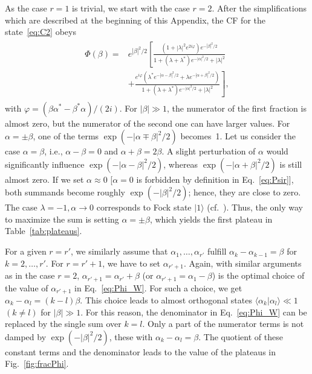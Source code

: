 \documentclass[aps,pra,twocolumn,showpacs,superscriptaddress,10pt]{revtex4-1}
\begin{document}
	As the case $r=1$ is trivial, we start with the case $r=2$.
	After the simplifications which are described at the beginning of this Appendix, the CF for the state~\eqref{eq:C2} obeys
	\begin{align}
	\begin{aligned}
		\Phi(\beta)=&e^{|\beta|^2/2}\left[\frac{(1+|\lambda|^2e^{2i\varphi})e^{-|\beta|^2/2}}{1+(\lambda+\lambda^{\ast})e^{-|\alpha|^{2}/2}+|\lambda|^2} \right.\\
		&+\left.\frac{e^{i\varphi}(\lambda^{\ast} e^{-|\alpha-\beta|^{2}/2}+\lambda e^{-|\alpha+\beta|^{2}/2})}{1+(\lambda+\lambda^{\ast})e^{-|\alpha|^{2}/2}+|\lambda|^2}\right],
	\end{aligned}
	\end{align}
	with $\varphi=(\beta\alpha^{\ast}-\beta^{\ast}\alpha)/(2i)$.
	For $|\beta|\gg 1$, the numerator of the first fraction is almost zero, but the numerator of the second one can have larger values.
	For $\alpha=\pm\beta$, one of the terms $\exp(-|\alpha\mp\beta|^2/2)$ becomes~1.
	Let us consider the case $\alpha=\beta$, i.e., $\alpha-\beta=0$ and $\alpha+\beta=2\beta$.
	A slight perturbation of $\alpha$ would significantly influence $\exp(-|\alpha-\beta|^2/2)$, whereas $\exp(-|\alpha+\beta|^2/2)$ is still almost zero.
	If we set $\alpha\approx0$ [$\alpha=0$ is forbidden by definition in Eq.~\eqref{eq:Psir}], both summands become roughly $\exp(-|\beta|^2/2)$; hence, they are close to zero.
	The case $\lambda=-1,\alpha\to0$ corresponds to Fock state $|1\rangle$ {(cf.~\cite{Vogel2014})}.
	Thus, the only way to maximize the sum is setting $\alpha=\pm\beta$, which yields the first plateau in Table~\ref{tab:plateaus}.
	
	For a given $r=r'$, we similarly assume that $\alpha_1,\dots,\alpha_{r'}$ fulfill $\alpha_{k}-\alpha_{k-1}=\beta$ for $k=2,\dots,r'$.
	For $r=r'+1$, we have to set $\alpha_{r'+1}$.
	Again, with similar arguments as in the case $r=2$, $\alpha_{r'+1}=\alpha_{r'}+\beta$ (or $\alpha_{r'+1}=\alpha_1-\beta$) is the optimal choice of the value of $\alpha_{r'+1}$ in Eq.~\eqref{eq:Phi_W}.
	For such a choice, we get $\alpha_{k}-\alpha_{l}=(k-l)\beta$.
	This choice leads to almost orthogonal states $\langle\alpha_{k}|\alpha_{l}\rangle\ll 1$ $(k\neq l)$ for $|\beta|\gg 1$.
	For this reason, the denominator in Eq.~\eqref{eq:Phi_W} can be replaced by the single sum over $k=l$.
	Only a part of the numerator terms is not damped by $\exp(-|\beta|^2/2)$, these with $\alpha_{k}-\alpha_{l}=\beta$.
	The quotient of these constant terms and the denominator leads to the value of the plateaus in Fig.~\ref{fig:fracPhi}.
\end{document}
